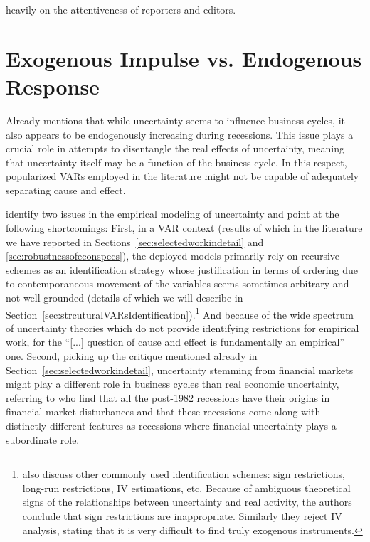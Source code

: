 \documentclass[a4paper,11pt,listof=nochaptergap,oneside,pointednumbers,bibtotoc,bigheadings,liststotoc]{scrbook}
\theoremstyle{mysatz}
\theoremstyle{mydefinition}
\theoremstyle{mytheorem}
\theoremstyle{mybemerkung}
\begin{document}
heavily on the attentiveness of reporters and editors. 

\section{Exogenous Impulse vs. Endogenous Response}
\label{sec:exoEndoJuradoetal}
Already \citet{bloom:14} mentions that while uncertainty seems to influence business cycles, it also appears to be endogenously increasing during recessions. This issue plays a crucial role in attempts to disentangle the real effects of uncertainty, meaning that uncertainty itself may be a function of the business cycle. In this respect, popularized VARs employed in the literature might not be capable of adequately separating cause and effect.

 \citet{ludvigsonetal:18} identify two issues in the empirical modeling of uncertainty and point at the following shortcomings: First, in a VAR context (results of which in the literature we have reported in Sections~\ref{sec:selectedworkindetail} and \ref{sec:robustnessofeconspecs}), the deployed models primarily rely on recursive schemes as an identification strategy whose justification in terms of ordering due to contemporaneous movement of the variables seems sometimes arbitrary and not well grounded (details of which we will describe in Section~\ref{sec:strcuturalVARsIdentification}).\footnote{\citet{ludvigsonetal:18} also discuss other commonly used identification schemes: sign restrictions, long-run restrictions, IV estimations, etc. Because of ambiguous theoretical signs of the relationships between uncertainty and real activity, the authors conclude that sign restrictions are inappropriate. Similarly they reject IV analysis, stating that it is very difficult to find truly exogenous instruments.} And because of the wide spectrum of uncertainty theories which do not provide identifying restrictions for empirical work, for \citet[p. 5]{ludvigsonetal:18} the ``[...] question of cause and effect is fundamentally an empirical'' one. Second, picking up the critique mentioned already in Section~\ref{sec:selectedworkindetail}, uncertainty stemming from financial markets might play a different role in business cycles than real economic uncertainty, referring to \citet{ngandwright:13} who find that all the post-1982 recessions have their origins in financial market disturbances and that these recessions come along with distinctly different features as recessions where financial uncertainty plays a subordinate role.
\end{document}
